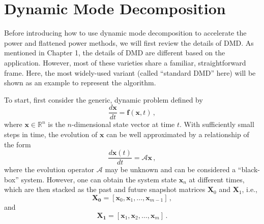 \cleardoublepage

\chapter{Dynamic Mode Decomposition}
\label{chapter:DMD-PM}

Before introducing how to use dynamic mode decomposition to accelerate the power and flattened power methods, we will first review the details of DMD.
As mentioned in Chapter 1, the details of DMD are different based on the application.
However, most of these varieties share a familiar, straightforward frame. 
Here, the most widely-used variant (called ``standard DMD'' here) will be shown as an example to represent the algorithm.

To start, first consider the generic, dynamic problem defined by 
\begin{equation}
  \frac{d{\mathbf{x}}}{dt}=\mathbf{f}(\mathbf{x},t) \, ,
  \label{eq:dynamic_problem}
\end{equation}
where $\mathbf{x} \in \mathbb{R}^{n}$ is the $n$-dimensional state vector at time $t$. 
With sufficiently small steps in time, the evolution of  $\mathbf{x}$ can be well approximated by a relationship of the form 
\begin{equation}
 \frac{d{\mathbf{x}}(t)}{dt}=\mathcal{A}\mathbf{x} \, ,
 \label{eq:linearized_model}
\end{equation}
where the evolution operator $\mathcal{A}$ may be unknown and can be considered a ``black-box'' system.
However, one can obtain the system state $\mathbf{x}_n$ at different times, which are then stacked as the past and future snapshot matrices $ \mathbf{X}_0$ and $ \mathbf{X}_1$, i.e., 
\begin{equation}
\label{eq:past_data}
\mathbf{X_0}=\left[ \mathbf{x}_0, \mathbf{x}_1, \ldots, \mathbf{x}_{m-1} \right] \, ,
\end{equation}
and
\begin{equation}
\label{eq:future_data}
\mathbf{X_1}=\left[ \mathbf{x}_1, \mathbf{x}_2, \ldots, \mathbf{x}_{m} \right] \, .
\end{equation}

